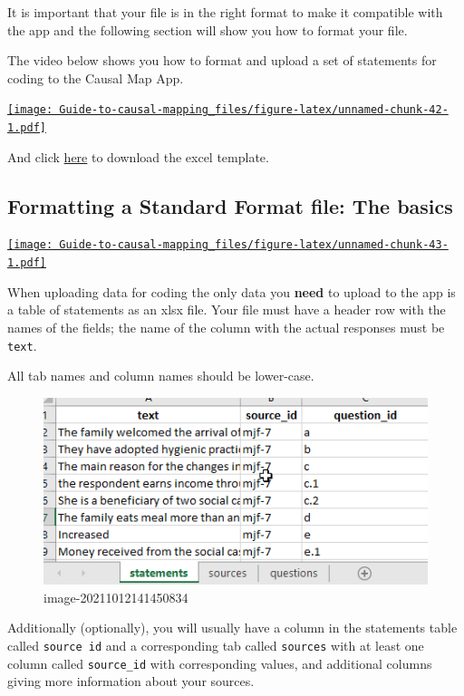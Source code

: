 \documentclass[
]{book}
\begin{document}
It is important that your file is in the right format to make it compatible with the app and the following section will show you how to format your file.

The video below shows you how to format and upload a set of statements for coding to the Causal Map App.

\href{https://player.vimeo.com/video/637121851}{\texttt{[image: Guide-to-causal-mapping\_files/figure-latex/unnamed-chunk-42-1.pdf]}}

And click \href{https://causalmap.app/wp-content/uploads/2022/03/template-upload-2-2.xlsx}{here} to download the excel template.

\hypertarget{formattingyourfile}{%
\subsection{Formatting a Standard Format file: The basics}\label{formattingyourfile}}

\href{https://player.vimeo.com/video/604138709}{\texttt{[image: Guide-to-causal-mapping\_files/figure-latex/unnamed-chunk-43-1.pdf]}}

When uploading data for coding the only data you \textbf{need} to upload to the app is a table of statements as an xlsx file. Your file must have a header row with the names of the fields; the name of the column with the actual responses must be \texttt{text}.

All tab names and column names should be lower-case.

\begin{figure}
\centering
\includegraphics[width=6.77083in,height=\textheight]{_assets/image-20211012141450834.png}
\caption{image-20211012141450834}
\end{figure}

Additionally (optionally), you will usually have a column in the statements table called \texttt{source\ id} and a corresponding tab called \texttt{sources} with at least one column called \texttt{source\_id} with corresponding values, and additional columns giving more information about your sources.
\end{document}
